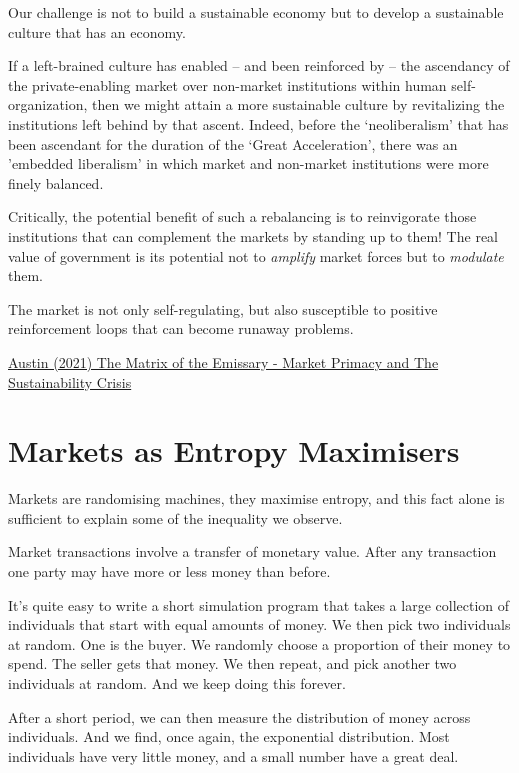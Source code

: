 \documentclass[
]{book}
\begin{document}
Our challenge is not to build a sustainable economy but to develop a sustainable culture that has an economy.

If a left-brained culture has enabled -- and been reinforced by -- the ascendancy of the private-enabling market over non-market institutions within human self-organization, then we might attain a more sustainable culture by revitalizing the institutions left behind by that ascent. Indeed, before the `neoliberalism' that has been ascendant for the duration of the `Great Acceleration', there was an 'embedded liberalism' in which market and non-market institutions were more finely balanced.

Critically, the potential benefit of such a rebalancing is to reinvigorate those institutions that can complement the markets by standing up to them! The real value of government is its potential not to \emph{amplify} market forces but to \emph{modulate} them.

The market is not only self-regulating, but also susceptible to positive reinforcement loops that can become runaway problems.

\href{https://channelmcgilchrist.com/articles/the-matrix-of-the-emissary/}{Austin (2021) The Matrix of the Emissary - Market Primacy and The Sustainability Crisis}

\hypertarget{markets-as-entropy-maximisers}{%
\section{Markets as Entropy Maximisers}\label{markets-as-entropy-maximisers}}

Markets are randomising machines,
they maximise entropy,
and this fact alone is sufficient to explain some of the inequality we observe.

Market transactions involve a transfer of monetary value. After any transaction one party may have more or less money than before.

It's quite easy to write a short simulation program that takes a large collection of individuals that start with equal amounts of money. We then pick two individuals at random. One is the buyer. We randomly choose a proportion of their money to spend. The seller gets that money. We then repeat, and pick another two individuals at random. And we keep doing this forever.

After a short period, we can then measure the distribution of money across individuals. And we find, once again, the exponential distribution. Most individuals have very little money, and a small number have a great deal.
\end{document}
